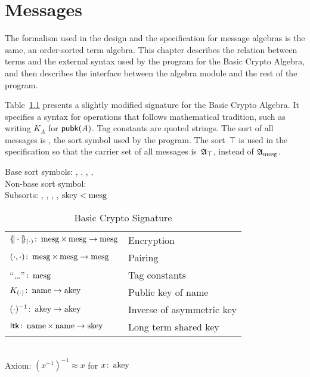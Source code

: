 \documentclass[12pt]{report}
\theoremstyle{definition}
\begin{document}
\chapter{Messages}\label{cha:messages}

The formalism used in the design and the specification for message
algebras is the same, an order-sorted term algebra.  This chapter
describes the relation between terms and the external syntax used by
the {\cpsa} program for the Basic Crypto Algebra, and then describes
the interface between the algebra module and the rest of the program.

Table~\ref{tab:bca} presents a slightly modified signature for the
Basic Crypto Algebra.  It specifies a syntax for operations that
follows mathematical tradition, such as writing $K_A$ for
$\operatorname{\mathsf{pubk}}(A)$.  Tag constants are quoted strings.  The sort of all
messages is , the sort symbol used by the {\cpsa} program.
The sort~$\top$ is used in the specification so that the carrier set
of all messages is~$\mathfrak A_\top$, instead of $\mathfrak A_{\operatorname{\mathrm{mesg}}}$.

\begin{table}
\begin{center}
Base sort symbols: , , , ,
\\
Non-base sort symbol:  \\[1ex]
Subsorts: , , , ,
$\operatorname{\mathrm{skey}}<\operatorname{\mathrm{mesg}}$\\[1ex]
\begin{tabular}{@{}ll}
$\{\!|\cdot|\!\}_{(\cdot)}\colon\operatorname{\mathrm{mesg}}\times\operatorname{\mathrm{mesg}}\rightarrow\operatorname{\mathrm{mesg}}$
&Encryption\\
$(\cdot,\cdot)\colon\operatorname{\mathrm{mesg}}\times\operatorname{\mathrm{mesg}}\rightarrow\operatorname{\mathrm{mesg}}$
&Pairing\\
``\ldots''$\colon\operatorname{\mathrm{mesg}}$& Tag constants\\
$K_{(\cdot)}\colon\operatorname{\mathrm{name}}\rightarrow\operatorname{\mathrm{akey}}$
&Public key of name\\
$(\cdot)^{-1}\colon\operatorname{\mathrm{akey}}\rightarrow\operatorname{\mathrm{akey}}$
&Inverse of asymmetric key\\
$\operatorname{\mathsf{ltk}}\colon\operatorname{\mathrm{name}}\times\operatorname{\mathrm{name}}\rightarrow\operatorname{\mathrm{skey}}$
& Long term shared key
\end{tabular}\\[1ex]
Axiom: $(x^{-1})^{-1}\approx x$ for $x\colon\operatorname{\mathrm{akey}}$\\[1ex]
\caption{Basic Crypto Signature}\label{tab:bca}
\end{center}
\end{table}
\end{document}
